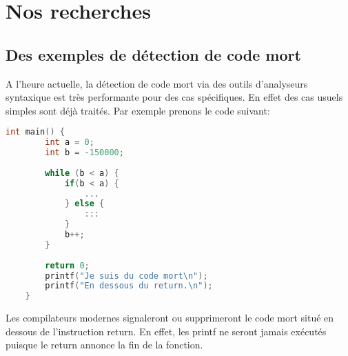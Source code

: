 \section{Nos recherches}
\subsection{Des exemples de détection de code mort}
A l'heure actuelle, la détection de code mort via des outils d'analyseurs syntaxique est très performante pour des cas spécifiques. En effet des cas usuels simples sont déjà traités. Par exemple prenons le code suivant:
\begin{lstlisting}[language=c, xleftmargin=.25\textwidth, caption={Exemple de programme avec du code mort}, captionpos=b]
    int main() {
        int a = 0;
        int b = -150000;
        
        while (b < a) {
            if(b < a) {
                ...
            } else {
                :::
            }
            b++;
        }
    
        return 0;
        printf("Je suis du code mort\n");
        printf("En dessous du return.\n");
    }
\end{lstlisting}

Les compilateurs modernes signaleront ou supprimeront le code mort situé en dessous de l'instruction return. En effet, les printf ne seront jamais exécutés puisque le return annonce la fin de la fonction.


